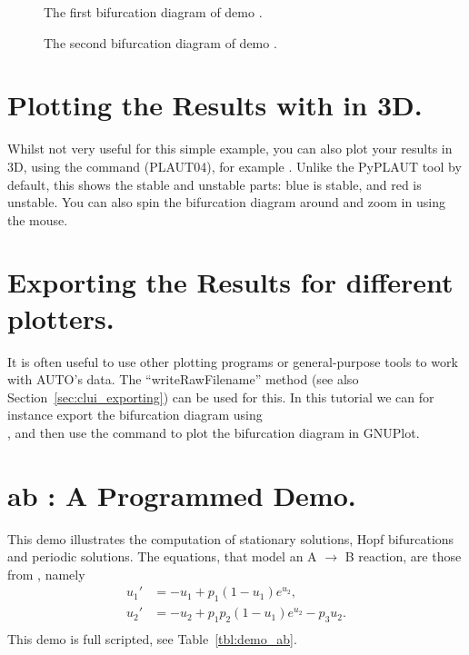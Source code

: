 \documentclass[12pt]{report}
\begin{document}
\begin{figure}[p]
\epsfysize 9.0cm
\centerline{}
\caption{The first bifurcation diagram of demo .}
\label{fig:cusp_1}
\end{figure}
\begin{figure}[p]
\epsfysize 9.0cm
\centerline{}
\caption{The second bifurcation diagram of demo .}
\label{fig:cusp_2}
\end{figure}

\section{ Plotting the Results with \AUTO in 3D.}
Whilst not very useful for this simple example, you can also plot
your results in 3D, using the  command ({\cal PLAUT04}), for example
. Unlike the PyPLAUT tool by default, this shows
the stable and unstable parts: blue is stable, and red is unstable. You can also
spin the bifurcation diagram around and zoom in using the mouse.

\section{ Exporting the Results for different plotters.}
It is often useful to use other plotting programs or general-purpose
tools to work with AUTO's data. The ``writeRawFilename'' method (see
also Section~\ref{sec:clui_exporting}) can be used for this.
In this tutorial we can for
instance export the bifurcation diagram using\\
, and then use
the command  to plot
the bifurcation diagram in GNUPlot.

\newpage
\section{ ab : A Programmed Demo.} \label{sec:Demos_ab}
This demo illustrates the computation of 
stationary solutions,
Hopf bifurcations 
and 
periodic solutions.
The equations, that model an A $\to$ B  reaction, are those from
 \citeyear{URP:74}, namely
\begin{equation} \begin{array}{cl}
  u_1 ' &=  -u_1 + p_1 (1-u_1) e^{u_2}, \\
  u_2 ' &=  -u_2 +  p_1 p_2 ( 1-u_1) e^{u_2} - p_3 u_2.\\
\end{array} \end{equation}
This demo is full scripted, see Table~\ref{tbl:demo_ab}.
\end{document}
